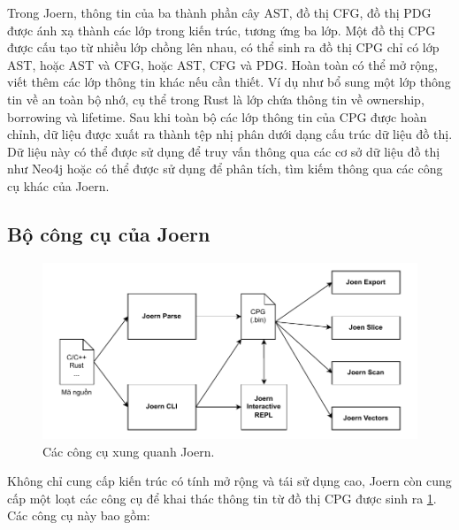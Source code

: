 Trong Joern, thông tin của ba thành phần cây AST, đồ thị CFG, đồ thị PDG được ánh xạ thành các lớp trong kiến trúc, tương ứng ba lớp.
Một đồ thị CPG được cấu tạo từ nhiều lớp chồng lên nhau, có thể sinh ra đồ thị CPG chỉ có lớp AST, hoặc AST và CFG, hoặc AST, CFG và PDG.
Hoàn toàn có thể mở rộng, viết thêm các lớp thông tin khác nếu cần thiết.
Ví dụ như bổ sung một lớp thông tin về an toàn bộ nhớ, cụ thể trong Rust là lớp chứa thông tin về ownership, borrowing và lifetime.
Sau khi toàn bộ các lớp thông tin của CPG được hoàn chỉnh, dữ liệu được xuất ra thành tệp nhị phân dưới dạng cấu trúc dữ liệu đồ thị.
Dữ liệu này có thể được sử dụng để truy vấn thông qua các cơ sở dữ liệu đồ thị như Neo4j \cite{miller2013graph} hoặc có thể được sử dụng để phân tích, tìm kiếm thông qua các công cụ khác của Joern.

\subsection{Bộ công cụ của Joern}

\begin{figure}[H]
  \includegraphics[width=1\columnwidth]{figures/c2/c2_joern_tools.drawio.pdf}
  \centering
  \caption{Các công cụ xung quanh Joern.}
  \label{img:c2_joern_tools}
\end{figure}

Không chỉ cung cấp kiến trúc có tính mở rộng và tái sử dụng cao, Joern còn cung cấp một loạt các công cụ để khai thác thông tin từ đồ thị CPG được sinh ra \ref{img:c2_joern_tools}.
Các công cụ này bao gồm:

